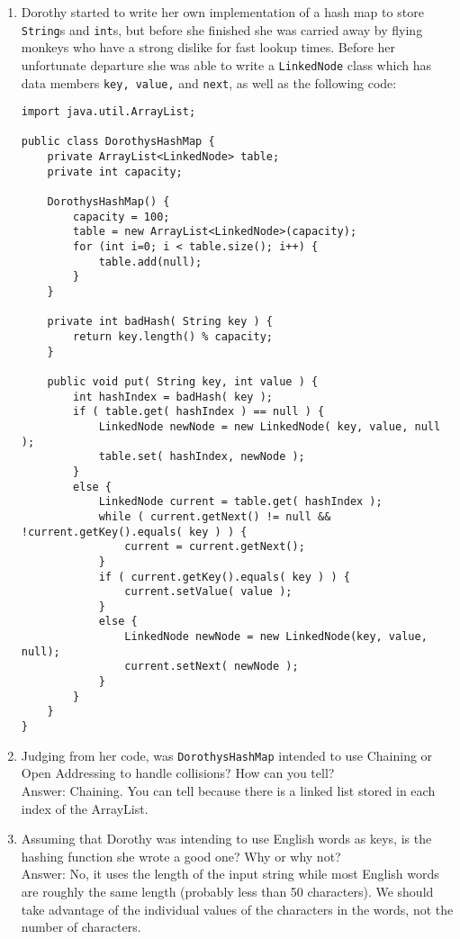 \documentclass[11pt]{article}
\newenvironment{answer}{\large\lstset{basicstyle=\large\ttfamily}\color{white} \small{Answer:}}{}
\newenvironment{answer}{\large\lstset{basicstyle=\large\ttfamily}\color{red} \small{Answer:}}{}
\begin{document}
\begin{enumerate}
\item
Dorothy started to write her own implementation of a hash map to store {\tt String}s and {\tt int}s, but before she finished she was carried away by flying monkeys who have a strong dislike for fast lookup times. Before her unfortunate departure she was able to write a {\tt LinkedNode} class which has data members {\tt key, value,} and {\tt next}, as well as the following code:
\begin{lstlisting}
import java.util.ArrayList;

public class DorothysHashMap {
	private ArrayList<LinkedNode> table;
	private int capacity;
    
	DorothysHashMap() {
		capacity = 100;
		table = new ArrayList<LinkedNode>(capacity);
		for (int i=0; i < table.size(); i++) {
			table.add(null);
		}
	}
    
	private int badHash( String key ) {
		return key.length() % capacity;
	}
    
	public void put( String key, int value ) {
		int hashIndex = badHash( key );
		if ( table.get( hashIndex ) == null ) {
			LinkedNode newNode = new LinkedNode( key, value, null );
			table.set( hashIndex, newNode );
		}
		else {
			LinkedNode current = table.get( hashIndex );
			while ( current.getNext() != null && !current.getKey().equals( key ) ) {
				current = current.getNext();
			}
			if ( current.getKey().equals( key ) ) {
				current.setValue( value );
			}
			else {
				LinkedNode newNode = new LinkedNode(key, value, null);
				current.setNext( newNode );
			}
		}
	}
}
\end{lstlisting}



\item Judging from her code, was {\tt DorothysHashMap} intended to use Chaining or Open Addressing to handle collisions? How can you tell? \\
\begin{answer}
Chaining. You can tell because there is a linked list stored in each index of the ArrayList.
\end{answer}



\item Assuming that Dorothy was intending to use English words as keys, is the hashing function she wrote a good one? Why or why not? \\
\begin{answer}
No, it uses the length of the input string while most English words are roughly the same length (probably less than 50 characters). We should take advantage of the individual values of the characters in the words, not the number of characters.  
\end{answer}




\end{enumerate}
\end{document}
